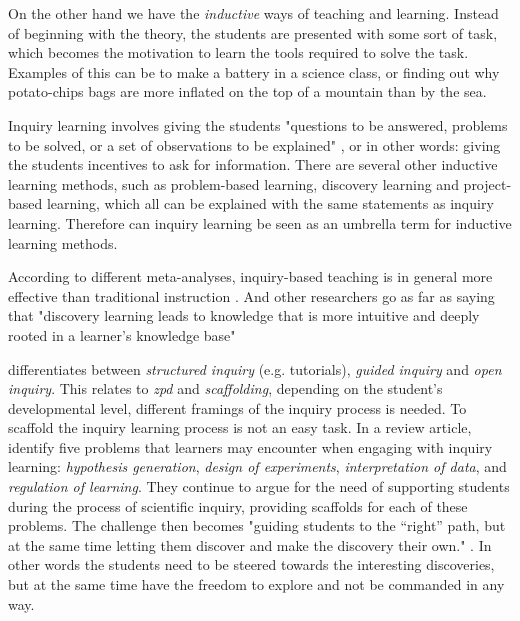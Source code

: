 On the other hand we have the \textit{inductive} ways of teaching and learning. Instead of beginning with the theory, the students are presented with some sort of task, which becomes the motivation to learn the tools required to solve the task. Examples of this can be to make a battery in a science class, or finding out why potato-chips bags are more inflated on the top of a mountain than by the sea.

Inquiry learning involves giving the students "questions to be answered, problems to be solved, or a set of observations to be explained" \citep{prince2006inductive}, or in other words: giving the students incentives to ask for information. There are several other inductive learning methods, such as problem-based learning, discovery learning and project-based learning, which all can be explained with the same statements as inquiry learning. Therefore can inquiry learning be seen as an umbrella term for inductive learning methods. \citep{prince2006inductive}

According to different meta-analyses, inquiry-based teaching is in general more effective than traditional instruction \citetext{\citealp{smith1996meta}; \citealp{haury1993teaching}, referenced in \citealp{prince2006inductive}}. And other researchers go as far as saying that "discovery learning leads to knowledge that is more intuitive and deeply rooted in a learner's knowledge base" \citetext{\citealp{berry1984relationship}; \citealp{laurillard1992learning}; \citealp{lindstrom1993computer}; \citealp{de1996measuring}, referenced in \citealp{de1998scientific}}

\citeauthor*{staver1987analysis} \citetext{\citeyear{staver1987analysis}, referenced in \citealp{prince2006inductive}} differentiates between \emph{structured inquiry} (e.g. tutorials), \emph{guided inquiry} and \emph{open inquiry}. This relates to \emph{zpd} and \emph{scaffolding}, depending on the student's developmental level, different framings of the inquiry process is needed. To scaffold the inquiry learning process is not an easy task. In a review article, \citet{de1998scientific} identify five problems that learners may encounter when engaging with inquiry learning: \textit{hypothesis generation}, \textit{design of experiments}, \textit{interpretation of data}, and \textit{regulation of learning}. They continue to argue for the need of supporting students during the process of scientific inquiry, providing scaffolds for each of these problems. The challenge then becomes "guiding students to the “right” path, but at the
same time letting them discover and make the discovery their own." \citep[p. 247]{kluge2010simulation}. In other words the students need to be steered towards the interesting discoveries, but at the same time have the freedom to explore and not be commanded in any way.

